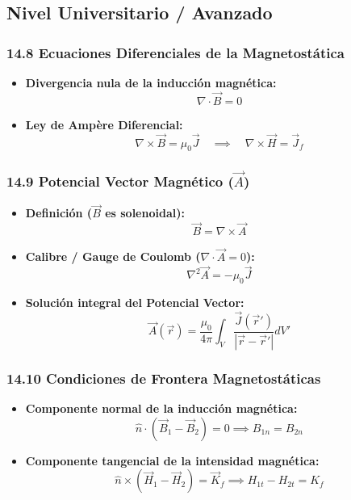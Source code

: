 \documentclass[11pt,a4paper]{article}
\begin{document}
\subsection*{Nivel Universitario / Avanzado}

\subsubsection*{14.8 Ecuaciones Diferenciales de la Magnetostática}

\begin{itemize}
  \item \textbf{Divergencia nula de la inducción magnética:}
  \[
    \nabla \cdot \vec{B} = 0
  \]
  \item \textbf{Ley de Ampère Diferencial:}
  \[
    \nabla \times \vec{B} = \mu_0 \vec{J} \quad \implies \quad \nabla \times \vec{H} = \vec{J}_f
  \]
\end{itemize}

\subsubsection*{14.9 Potencial Vector Magnético ($\vec{A}$)}

\begin{itemize}
  \item \textbf{Definición ($\vec{B}$ es solenoidal):}
  \[
    \vec{B} = \nabla \times \vec{A}
  \]
  \item \textbf{Calibre / Gauge de Coulomb ($\nabla \cdot \vec{A} = 0$):}
  \[
    \nabla^2 \vec{A} = -\mu_0 \vec{J}
  \]
  \item \textbf{Solución integral del Potencial Vector:}
  \[
    \vec{A}(\vec{r}) = \frac{\mu_0}{4\pi} \int_V \frac{\vec{J}(\vec{r}')}{|\vec{r} - \vec{r}'|} dV'
  \]
\end{itemize}

\subsubsection*{14.10 Condiciones de Frontera Magnetostáticas}

\begin{itemize}
  \item \textbf{Componente normal de la inducción magnética:}
  \[
    \hat{n} \cdot (\vec{B}_1 - \vec{B}_2) = 0 \implies B_{1n} = B_{2n}
  \]
  \item \textbf{Componente tangencial de la intensidad magnética:}
  \[
    \hat{n} \times (\vec{H}_1 - \vec{H}_2) = \vec{K}_f \implies H_{1t} - H_{2t} = K_f
  \]
\end{itemize}
\end{document}
